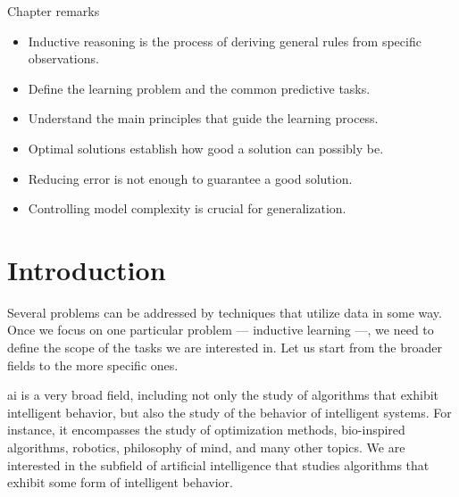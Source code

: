 \begin{mainbox}{Chapter remarks}


  \startcontents[chapters]
  \vspace{1em}


  \begin{itemize}
    \itemsep0em
    \item Inductive reasoning is the process of deriving general rules from specific
      observations.
  \end{itemize}


  \begin{itemize}
    \itemsep0em
    \item Define the learning problem and the common predictive tasks.
    \item Understand the main principles that guide the learning process.
  \end{itemize}


  \begin{itemize}
    \itemsep0em
    \item Optimal solutions establish how good a solution can possibly be.
    \item Reducing error is not enough to guarantee a good solution.
    \item Controlling model complexity is crucial for generalization.
  \end{itemize}
\end{mainbox}

{}
\clearpage

\section{Introduction} %

Several problems can be addressed by techniques that utilize data in some way.  Once we focus on
one particular problem --- inductive learning ---, we need to define the scope of the
tasks we are interested in.  Let us start from the broader fields to the more specific
ones.

\Gls{ai} is a very broad field, including not only the study of algorithms
that exhibit intelligent behavior, but also the study of the behavior of intelligent
systems.  For instance, it encompasses the study of optimization methods, bio-inspired algorithms,
robotics, philosophy of mind, and many other topics.  We are interested in the subfield of
artificial intelligence that studies algorithms that exhibit some form of intelligent
behavior.

